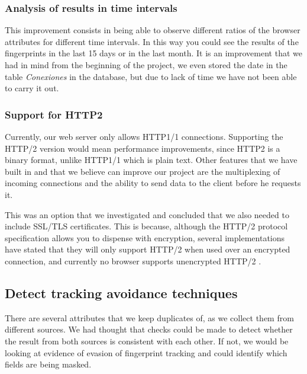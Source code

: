 \subsubsection{Analysis of results in time intervals}
This improvement consists in being able to observe different ratios of the browser attributes for different time intervals. In this way you could see the results of the fingerprints in the last 15 days or in the last month. It is an improvement that we had in mind from the beginning of the project, we even stored the date in the table \textit{Conexiones} in the database, but due to lack of time we have not been able to carry it out.

\subsubsection{Support for HTTP2}
Currently, our web server only allows HTTP1/1 connections. Supporting the HTTP/2 version would mean performance improvements, since HTTP2 is a binary format, unlike HTTP1/1 which is plain text. Other features that we have built in and that we believe can improve our project are the multiplexing of incoming connections and the ability to send data to the client before he requests it. \par
This was an option that we investigated and concluded that we also needed to include SSL/TLS certificates. This is because, although the HTTP/2 protocol specification allows you to dispense with encryption, several implementations have stated that they will only support HTTP/2 when used over an encrypted connection, and currently no browser supports unencrypted HTTP/2 \cite{http2}. \par
\subsection{Detect tracking avoidance techniques}
There are several attributes that we keep duplicates of, as we collect them from different sources. We had thought that checks could be made to detect whether the result from both sources is consistent with each other. If not, we would be looking at evidence of evasion of fingerprint tracking and could identify which fields are being masked.
\noindent
